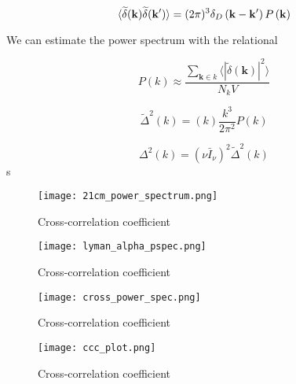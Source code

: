 \begin{equation}
\langle \widetilde{\delta} ({\bf k}) \widetilde{\delta} ({\bf k'}) \rangle = (2 \pi) ^3 \delta_D \left( {\bf k} - {\bf k'} \right) P \left({\bf k} \right)
\end{equation}

We can estimate the power spectrum with the relational

\begin{equation}
P\left( k\right) \approx \frac{\sum_{\textbf{k} \in k}\langle | \widetilde{\delta} \left( \textbf{k}\right) |^2 \rangle}{N_k V}
\end{equation}

\begin{equation}
    \widetilde{\Delta}^2 \left( k \right) =  \left( k \right) \frac{k^3}{2 \pi ^2} P \left( k \right)
\end{equation}

\begin{equation}
    \Delta^2 \left( k \right) = \left( \nu \bar{I}_{\nu} \right)^2 \widetilde{\Delta}^2 \left( k \right)
\end{equation}s

\begin{figure}[ht]
	\centering
	\texttt{[image: 21cm\_power\_spectrum.png]}
	\caption[21cm Power Spectrum]{Cross-correlation coefficient}
	\label{fig:21cm_ps}
\end{figure}

\begin{figure}[ht]
	\centering
	\texttt{[image: lyman\_alpha\_pspec.png]}
	\caption[Ly$\alpha$ Power Spectrum]{Cross-correlation coefficient}
	\label{fig:lya_ps}
\end{figure}

\begin{figure}[ht]
	\centering
	\texttt{[image: cross\_power\_spec.png]}
	\caption[Cross-Power Spectrum]{Cross-correlation coefficient}
	\label{fig:x_ps}
\end{figure}

\begin{figure}[ht]
	\centering
	\texttt{[image: ccc\_plot.png]}
	\caption[Cross-Correlation Coefficient]{Cross-correlation coefficient}
	\label{fig:ccc}
\end{figure}
